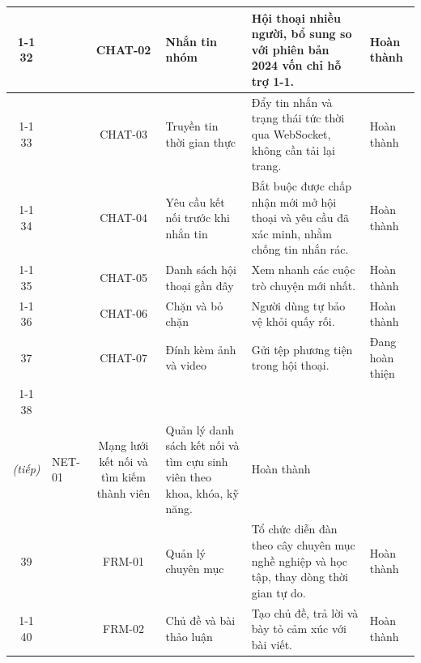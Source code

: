 \documentclass[12pt,a4paper,oneside]{report}
\begin{document}
\begin{landscape}
\begin{longtable}{|c|>{\raggedright\arraybackslash}p{3.1cm}|c|>{\raggedright\arraybackslash}p{4.6cm}|>{\raggedright\arraybackslash}p{8.4cm}|>{\raggedright\arraybackslash}p{2.4cm}|}
\cline{1-1}\cline{3-6}
\cellcolor{oldrow}32 & \cellcolor{oldrow} & \cellcolor{oldrow}CHAT-02 & \cellcolor{oldrow}Nhắn tin nhóm & \cellcolor{oldrow}Hội thoại nhiều người, bổ sung so với phiên bản 2024 vốn chỉ hỗ trợ 1-1. & \cellcolor{oldrow}Hoàn thành \\
\cline{1-1}\cline{3-6}
\cellcolor{oldrow}33 & \cellcolor{oldrow} & \cellcolor{oldrow}CHAT-03 & \cellcolor{oldrow}Truyền tin thời gian thực & \cellcolor{oldrow}Đẩy tin nhắn và trạng thái tức thời qua WebSocket, không cần tải lại trang. & \cellcolor{oldrow}Hoàn thành \\
\cline{1-1}\cline{3-6}
\cellcolor{oldrow}34 & \cellcolor{oldrow} & \cellcolor{oldrow}CHAT-04 & \cellcolor{oldrow}Yêu cầu kết nối trước khi nhắn tin & \cellcolor{oldrow}Bắt buộc được chấp nhận mới mở hội thoại và yêu cầu đã xác minh, nhằm chống tin nhắn rác. & \cellcolor{oldrow}Hoàn thành \\
\cline{1-1}\cline{3-6}
\cellcolor{oldrow}35 & \cellcolor{oldrow} & \cellcolor{oldrow}CHAT-05 & \cellcolor{oldrow}Danh sách hội thoại gần đây & \cellcolor{oldrow}Xem nhanh các cuộc trò chuyện mới nhất. & \cellcolor{oldrow}Hoàn thành \\
\cline{1-1}\cline{3-6}
\cellcolor{oldrow}36 & \multirow{-6}{2.4cm}{\cellcolor{oldrow}\textbf{Nhắn tin và kết nối}} & \cellcolor{oldrow}CHAT-06 & \cellcolor{oldrow}Chặn và bỏ chặn & \cellcolor{oldrow}Người dùng tự bảo vệ khỏi quấy rối. & \cellcolor{oldrow}Hoàn thành \\
\hline
\cellcolor{oldrow}37 & \cellcolor{oldrow} & \cellcolor{oldrow}CHAT-07 & \cellcolor{oldrow}Đính kèm ảnh và video & \cellcolor{oldrow}Gửi tệp phương tiện trong hội thoại. & \cellcolor{oldrow}Đang hoàn thiện \\
\cline{1-1}\cline{3-6}
\cellcolor{oldrow}38 & \multirow{-2}{2.4cm}{\cellcolor{oldrow}\textbf{Nhắn tin và kết nối\\\textit{(tiếp)}}} & \cellcolor{oldrow}NET-01 & \cellcolor{oldrow}Mạng lưới kết nối và tìm kiếm thành viên & \cellcolor{oldrow}Quản lý danh sách kết nối và tìm cựu sinh viên theo khoa, khóa, kỹ năng. & \cellcolor{oldrow}Hoàn thành \\
\hline
\cellcolor{oldrow}39 & \cellcolor{oldrow} & \cellcolor{oldrow}FRM-01 & \cellcolor{oldrow}Quản lý chuyên mục & \cellcolor{oldrow}Tổ chức diễn đàn theo cây chuyên mục nghề nghiệp và học tập, thay dòng thời gian tự do. & \cellcolor{oldrow}Hoàn thành \\
\cline{1-1}\cline{3-6}
\cellcolor{oldrow}40 & \cellcolor{oldrow} & \cellcolor{oldrow}FRM-02 & \cellcolor{oldrow}Chủ đề và bài thảo luận & \cellcolor{oldrow}Tạo chủ đề, trả lời và bày tỏ cảm xúc với bài viết. & \cellcolor{oldrow}Hoàn thành \\

\end{longtable}
\end{landscape}
\end{document}

